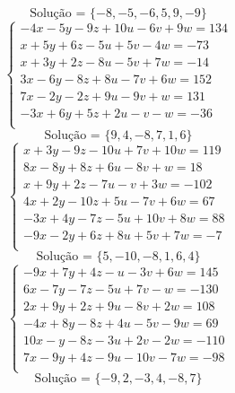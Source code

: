 \documentclass[12pt,oneside,a4paper]{article}
\begin{document}
\begin{equation*}
\text{Solução = }\{-8,-5,-6,5,9,-9\}
\end{equation*}
\vspace{\baselineskip}
\begin{equation*}
\begin{cases}
-4x-5y-9z+10u-6v+9w=134 \\
x+5y+6z-5u+5v-4w=-73 \\
x+3y+2z-8u-5v+7w=-14 \\
3x-6y-8z+8u-7v+6w=152 \\
7x-2y-2z+9u-9v+w=131 \\
-3x+6y+5z+2u-v-w=-36 \\
\end{cases}
\end{equation*}
\begin{equation*}
\text{Solução = }\{9,4,-8,7,1,6\}
\end{equation*}
\vspace{\baselineskip}
\begin{equation*}
\begin{cases}
x+3y-9z-10u+7v+10w=119 \\
8x-8y+8z+6u-8v+w=18 \\
x+9y+2z-7u-v+3w=-102 \\
4x+2y-10z+5u-7v+6w=67 \\
-3x+4y-7z-5u+10v+8w=88 \\
-9x-2y+6z+8u+5v+7w=-7 \\
\end{cases}
\end{equation*}
\begin{equation*}
\text{Solução = }\{5,-10,-8,1,6,4\}
\end{equation*}
\vspace{\baselineskip}
\begin{equation*}
\begin{cases}
-9x+7y+4z-u-3v+6w=145 \\
6x-7y-7z-5u+7v-w=-130 \\
2x+9y+2z+9u-8v+2w=108 \\
-4x+8y-8z+4u-5v-9w=69 \\
10x-y-8z-3u+2v-2w=-110 \\
7x-9y+4z-9u-10v-7w=-98 \\
\end{cases}
\end{equation*}
\begin{equation*}
\text{Solução = }\{-9,2,-3,4,-8,7\}
\end{equation*}
\end{document}
